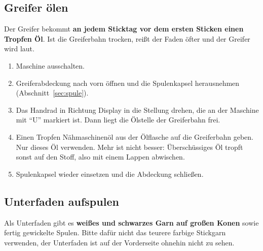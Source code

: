\documentclass{\basedir/fablab-document}
\begin{document}
	\subsection{Greifer ölen}
	\label{sec:oelen}
	Der Greifer bekommt \textbf{an jedem Sticktag vor dem ersten Sticken einen Tropfen Öl}. Ist die Greiferbahn trocken, reißt der Faden öfter und der Greifer wird laut.
	\begin{enumerate}
		\item Maschine ausschalten.
		\item Greiferabdeckung nach vorn öffnen und die Spulenkapsel herausnehmen (Abschnitt~\ref{sec:spule}).
		\item Das Handrad in Richtung Display in die Stellung drehen, die an der Maschine mit \enquote{U} markiert ist. Dann liegt die Ölstelle der Greiferbahn frei.
		\item Einen Tropfen Nähmaschinenöl aus der Ölflasche auf die Greiferbahn geben. Nur dieses Öl verwenden. Mehr ist nicht besser: Überschüssiges Öl tropft sonst auf den Stoff, also mit einem Lappen abwischen.
		\item Spulenkapsel wieder einsetzen und die Abdeckung schließen.
	\end{enumerate}

	\subsection{Unterfaden aufspulen}
	Als Unterfaden gibt es \textbf{weißes und schwarzes Garn auf großen Konen} sowie fertig gewickelte Spulen. Bitte dafür nicht das teurere farbige Stickgarn verwenden, der Unterfaden ist auf der Vorderseite ohnehin nicht zu sehen.
\end{document}
